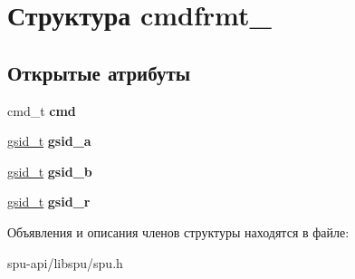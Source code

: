 \hypertarget{structcmdfrmt__4}{}\section{Структура cmdfrmt\+\_}
\label{structcmdfrmt__4}
\subsection*{Открытые атрибуты}
\begin{DoxyCompactItemize}
\item 
\mbox{\label{structcmdfrmt__4_afb64abb14ea1376cebcdd573f257a716}} 
cmd\+\_\+t {\bfseries cmd}
\item 
\mbox{\label{structcmdfrmt__4_a41019436a420b512fc5051820ca42448}} 
\hyperlink{structgsid__container}{gsid\+\_\+t} {\bfseries gsid\+\_\+a}
\item 
\mbox{\label{structcmdfrmt__4_ad89ae784f3b274f6c1c884b8969aaa05}} 
\hyperlink{structgsid__container}{gsid\+\_\+t} {\bfseries gsid\+\_\+b}
\item 
\mbox{\label{structcmdfrmt__4_a26b1f541bc59f610034f2871a978104f}} 
\hyperlink{structgsid__container}{gsid\+\_\+t} {\bfseries gsid\+\_\+r}
\end{DoxyCompactItemize}


Объявления и описания членов структуры находятся в файле\+:\begin{DoxyCompactItemize}
\item 
spu-\/api/libspu/spu.\+h\end{DoxyCompactItemize}
